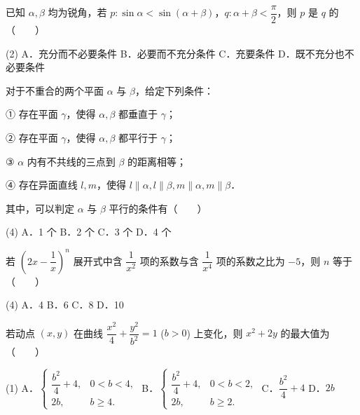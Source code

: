 \begin{question}
已知 $\alpha, \beta$ 均为锐角，若 $p: \sin\alpha < \sin(\alpha + \beta)$，$q: \alpha + \beta < \dfrac{\pi}{2}$，则 $p$ 是 $q$ 的\mbox{（　　）}

\begin{gkopts}(2)
\task A．充分而不必要条件
\task B．必要而不充分条件
\task C．充要条件
\task D．既不充分也不必要条件
\end{gkopts}

\end{question}
\begin{question}
对于不重合的两个平面 $\alpha$ 与 $\beta$，给定下列条件：

① 存在平面 $\gamma$，使得 $\alpha, \beta$ 都垂直于 $\gamma$；

② 存在平面 $\gamma$，使得 $\alpha, \beta$ 都平行于 $\gamma$；

③ $\alpha$ 内有不共线的三点到 $\beta$ 的距离相等；

④ 存在异面直线 $l, m$，使得 $l \parallel \alpha, l \parallel \beta, m \parallel \alpha, m \parallel \beta$．

其中，可以判定 $\alpha$ 与 $\beta$ 平行的条件有\mbox{（　　）}

\begin{gkopts}(4)
\task A．1 个
\task B．2 个
\task C．3 个
\task D．4 个
\end{gkopts}

\end{question}
\begin{question}
若 $\left(2x - \dfrac{1}{x}\right)^n$ 展开式中含 $\dfrac{1}{x^2}$ 项的系数与含 $\dfrac{1}{x^4}$ 项的系数之比为 $-5$，则 $n$ 等于\mbox{（　　）}

\begin{gkopts}(4)
\task A．4
\task B．6
\task C．8
\task D．10
\end{gkopts}

\end{question}
\begin{question}
若动点 $(x, y)$ 在曲线 $\dfrac{x^2}{4} + \dfrac{y^2}{b^2} = 1$ ($b > 0$) 上变化，则 $x^2 + 2y$ 的最大值为\mbox{（　　）}

\begin{gkopts}(1)
\task A．$\begin{cases} \dfrac{b^2}{4} + 4, & 0 < b < 4, \\ 2b, & b \geqslant 4. \end{cases}$
\task B．$\begin{cases} \dfrac{b^2}{4} + 4, & 0 < b < 2, \\ 2b, & b \geqslant 2. \end{cases}$
\task C．$\dfrac{b^2}{4} + 4$
\task D．$2b$
\end{gkopts}

\end{question}

